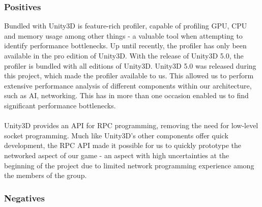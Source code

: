 \subsubsection*{Positives}
Bundled with Unity3D is feature-rich profiler, capable of profiling GPU, CPU
and memory usage among other things - a valuable tool when attempting to
identify performance bottlenecks. Up until recently, the profiler has only been
available in the pro edition of Unity3D. With the release of Unity3D 5.0, the
profiler is bundled with all editions of Unity3D. Unity3D 5.0 was released
during this project, which made the profiler available to us. This allowed us
to perform extensive performance analysis of different components within our
architecture, such as AI, networking. This has in more than one occasion
enabled us to find significant performance bottlenecks.
\\
\\
Unity3D provides an API for RPC programming, removing the need for low-level
socket programming. Much like Unity3D's other components offer quick
development, the RPC API made it possible for us to quickly prototype the
networked aspect of our game - an aspect with high uncertainties at the
beginning of the project due to limited network programming experience
among the members of the group.

\subsubsection*{Negatives}

